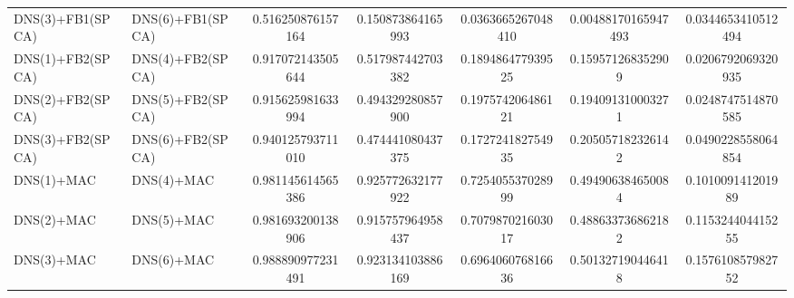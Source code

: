 \begin{table}[H]
\begin{tabular}{llSSSSS}
DNS(3)+FB1(SPCA) & DNS(6)+FB1(SPCA) & 0.516250876157164 & 0.150873864165993 & 0.0363665267048410 & 0.00488170165947493 & 0.0344653410512494 \\ 
DNS(1)+FB2(SPCA) & DNS(4)+FB2(SPCA) & 0.917072143505644 & 0.517987442703382 & 0.189486477939525 & 0.159571268352909 & 0.0206792069320935 \\ 
DNS(2)+FB2(SPCA) & DNS(5)+FB2(SPCA) & 0.915625981633994 & 0.494329280857900 & 0.197574206486121 & 0.194091310003271 & 0.0248747514870585 \\ 
DNS(3)+FB2(SPCA) & DNS(6)+FB2(SPCA) & 0.940125793711010 & 0.474441080437375 & 0.172724182754935 & 0.205057182326142 & 0.0490228558064854 \\ 
DNS(1)+MAC & DNS(4)+MAC & 0.981145614565386 & 0.925772632177922 & 0.725405537028999 & 0.494906384650084 & 0.101009141201989 \\ 
DNS(2)+MAC & DNS(5)+MAC & 0.981693200138906 & 0.915757964958437 & 0.707987021603017 & 0.488633736862182 & 0.115324404415255 \\ 
DNS(3)+MAC & DNS(6)+MAC & 0.988890977231491 & 0.923134103886169 & 0.696406076816636 & 0.501327190446418 & 0.157610857982752 \\ \bottomrule 
\end{tabular}
\end{table}


